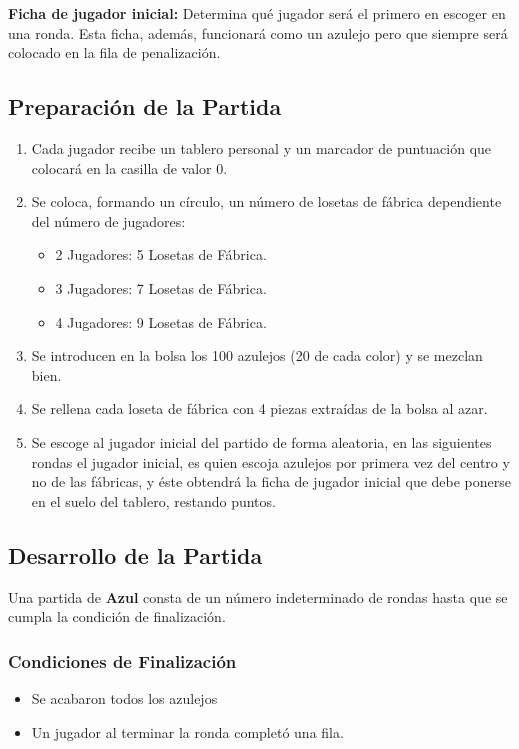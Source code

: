 \documentclass[11pt]{article}
\begin{document}
\textbf{Ficha de jugador inicial:} Determina qué jugador será el primero en escoger en una ronda. Esta ficha, además, funcionará como un azulejo pero que siempre será colocado en la fila de penalización.

\subsection{Preparación de la Partida}

\begin{enumerate}
	\item Cada jugador recibe un tablero personal y un marcador de puntuación que colocará en la casilla de valor 0.
	\item Se coloca, formando un círculo, un número de losetas de fábrica dependiente del número de jugadores:
	\begin{itemize}
		\item 2 Jugadores: 5 Losetas de Fábrica.
		\item 3 Jugadores: 7 Losetas de Fábrica.
		\item 4 Jugadores: 9 Losetas de Fábrica.
	\end{itemize}
	\item Se introducen en la bolsa los 100 azulejos (20 de cada color) y se mezclan bien.
	\item Se rellena cada loseta de fábrica con 4 piezas extraídas de la bolsa al azar.
	\item Se escoge al jugador inicial del partido de forma aleatoria, en las siguientes rondas el jugador inicial, es quien escoja azulejos por primera vez del centro y no de las fábricas, y éste obtendrá la ficha de jugador inicial que debe ponerse en el suelo del tablero, restando puntos.
\end{enumerate}

\subsection{Desarrollo de la Partida}

Una partida de \textbf{Azul} consta de un número indeterminado de rondas hasta que se cumpla la condición de finalización.

\subsubsection{Condiciones de Finalización}

\begin{itemize}
	\item Se acabaron todos los azulejos
	\item Un jugador al terminar la ronda completó una fila.
\end{itemize}
\end{document}
